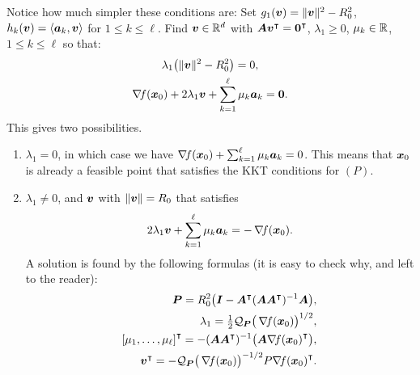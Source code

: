 Notice how much simpler these conditions are: Set $g_1(\boldsymbol{v}) = \lVert \boldsymbol{v} \rVert^2-R_0^2$, $h_k(\boldsymbol{v}) = \langle \boldsymbol{a}_k, \boldsymbol{v} \rangle$ for $1\leq k \leq \ell$.  Find $\boldsymbol{v} \in \mathbb{R}^d$ with $\boldsymbol{A}{\boldsymbol{v}}^\intercal = {\boldsymbol{0}}^\intercal$, $\lambda_1 \geq 0$, $\mu_k \in \mathbb{R}$, $1\leq k \leq \ell$ so that:
\begin{gather*}
\lambda_1 \big( \lVert \boldsymbol{v} \rVert^2 - R_0^2 \big) = 0, \\
\mathop{\nabla\! {f}}(\boldsymbol{x}_0) + 2\lambda_1 \boldsymbol{v} + \sum_{k=1}^\ell \mu_k \boldsymbol{a}_k = \boldsymbol{0}.
\end{gather*}
This gives two possibilities.
\begin{enumerate}
	\item $\lambda_1 = 0$, in which case we have $\mathop{\nabla\! {f}}(\boldsymbol{x}_0) + \sum_{k=1}^\ell \mu_k \boldsymbol{a}_k=0$.  This means that $\boldsymbol{x}_0$ is already a feasible point that satisfies the KKT conditions for $(P)$.
	\item $\lambda_1 \neq 0$, and $\boldsymbol{v}$ with $\lVert \boldsymbol{v} \rVert = R_0$ that satisfies
	\begin{equation*}
	2\lambda_1 \boldsymbol{v} + \sum_{k=1}^\ell \mu_k \boldsymbol{a}_k = - \mathop{\nabla\! {f}}(\boldsymbol{x}_0).
	\end{equation*}
	A solution is found by the following formulas (it is easy to check why, and left to the reader):
	\begin{equation}\label{equation:projMethodsSteepest}
	\begin{split}
	\boldsymbol{P} = R_0^2 \big( \boldsymbol{I} - {\boldsymbol{A}}^\intercal ( \boldsymbol{A} {\boldsymbol{A}}^\intercal )^{-1} \boldsymbol{A} \big), \\
	\lambda_1 = \tfrac{1}{2} \mathcal{Q}_{\boldsymbol{P}}\big(\mathop{\nabla\! {f}}(\boldsymbol{x}_0)\big)^{1/2}, \\
	{[\mu_1, \dotsc, \mu_\ell]}^\intercal = -(\boldsymbol{A}{\boldsymbol{A}}^\intercal)^{-1} \big( \boldsymbol{A}{\mathop{\nabla\! {f}}(\boldsymbol{x}_0)}^\intercal \big), \\
	{\boldsymbol{v}}^\intercal = -\mathcal{Q}_{\boldsymbol{P}}\big(\mathop{\nabla\! {f}}(\boldsymbol{x}_0)\big)^{-1/2} P {\mathop{\nabla\! {f}}(\boldsymbol{x}_0)}^\intercal.
	\end{split}
	\end{equation}
\end{enumerate}

